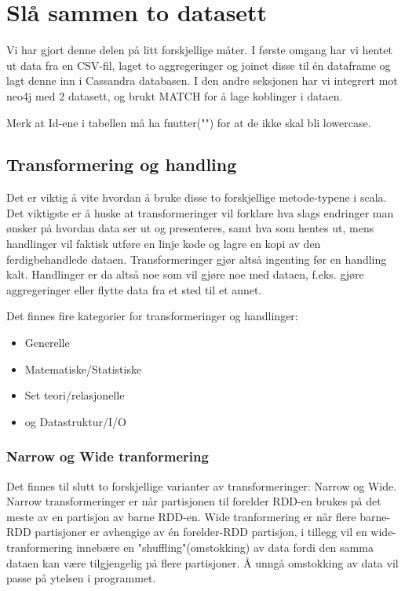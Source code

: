 \section{Slå sammen to datasett}
Vi har gjort denne delen på litt forskjellige måter. I første omgang har vi hentet ut data fra en CSV-fil, laget to aggregeringer og joinet disse til én dataframe og lagt denne inn i Cassandra databasen. I den andre seksjonen har vi integrert mot neo4j med 2 datasett, og brukt MATCH for å lage koblinger i dataen.

Merk at Id-ene i tabellen må ha fnutter("") for at de ikke skal bli lowercase.


\subsection{Transformering og handling}
Det er viktig å vite hvordan å bruke disse to forskjellige metode-typene i scala. Det viktigste er å huske at transformeringer vil forklare hva slags endringer man ønsker på hvordan data ser ut og presenteres, samt hva som hentes ut, mens handlinger vil faktisk utføre en linje kode og lagre en kopi av den ferdigbehandlede dataen. Transformeringer gjør altså ingenting før en handling kalt. Handlinger er da altså noe som vil gjøre noe med dataen, f.eks. gjøre aggregeringer eller flytte data fra et sted til et annet.

Det finnes fire kategorier for transformeringer og handlinger:

\begin{itemize}
    \item Generelle
    \item Matematiske/Statistiske
    \item Set teori/relasjonelle
    \item og Datastruktur/I/O
\end{itemize}

\subsubsection{Narrow og Wide tranformering}
Det finnes til slutt to forskjellige varianter av transformeringer: Narrow og Wide. Narrow transformeringer er når partisjonen til forelder RDD-en brukes på det meste av en partisjon av barne RDD-en. Wide tranformering er når flere barne-RDD partisjoner er avhengige av én forelder-RDD partisjon, i tillegg vil en wide-tranformering innebære en "shuffling"(omstokking) av data fordi den samma dataen kan være tilgjengelig på flere partisjoner. Å unngå omstokking av data vil passe på ytelsen i programmet.


